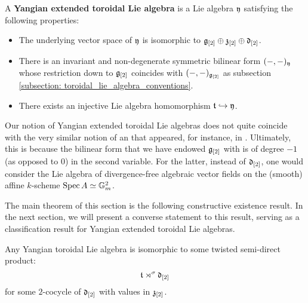         \begin{definition} \label{def: extended_toroidal_lie_algebras}
                A \textbf{Yangian extended toroidal Lie algebra} is a Lie algebra $\mathfrak{y}$ satisfying the following properties:
            \begin{itemize}
                \item The underlying vector space of $\mathfrak{y}$ is isomorphic to $\mathfrak{g}_{[2]} \oplus \mathfrak{z}_{[2]} \oplus \mathfrak{d}_{[2]}$.
                \item There is an invariant and non-degenerate symmetric bilinear form $(-, -)_{\mathfrak{y}}$ whose restriction down to $\mathfrak{g}_{[2]}$ coincides with $(-, -)_{\mathfrak{g}_{[2]}}$ as subsection \ref{subsection: toroidal_lie_algebra_conventions}.
                \item There exists an injective Lie algebra homomorphism $\mathfrak{t} \hookrightarrow \mathfrak{y}$.
            \end{itemize}
        \end{definition}
        \begin{remark}
            Our notion of Yangian extended toroidal Lie algebras does not quite coincide with the very similar notion of an  that appeared, for instance, in \cite{billig_representations_of_toroidal_extended_affine_lie_algebras}. Ultimately, this is because the bilinear form that we have endowed $\mathfrak{g}_{[2]}$ with is of degree $-1$ (as opposed to $0$) in the second variable. For the latter, instead of $\mathfrak{d}_{[2]}$, one would consider the Lie algebra of divergence-free algebraic vector fields on the (smooth) affine $k$-scheme $\operatorname{Spec} A \simeq \mathbb{G}_m^2$.
        \end{remark}

        The main theorem of this section is the following constructive existence result. In the next section, we will present a converse statement to this result, serving as a classification result for Yangian extended toroidal Lie algebras.
        \begin{theorem} \label{theorem: yangian_extended_toroidal_lie_algebras_preliminary_version}
            Any Yangian toroidal Lie algebra is isomorphic to some twisted semi-direct product:
                $$\mathfrak{t} \rtimes^{\sigma} \mathfrak{d}_{[2]}$$
            for some $2$-cocycle of $\mathfrak{d}_{[2]}$ with values in $\mathfrak{z}_{[2]}$.
        \end{theorem}

